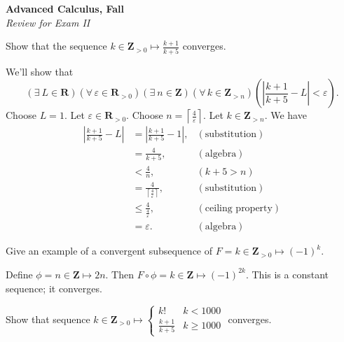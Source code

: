 \documentclass[12pt,fleqn,answers]{exam}
\newcommand{\reals}{\mathbf{R}}
\newcommand{\integers}{\mathbf{Z}}
\let\oldforall\forall
\renewcommand{\forall}{\oldforall \, }
\let\oldexist\exists
\renewcommand{\exists}{\oldexist \: }
\begin{document}
\large
\begin{flushleft}
  \textbf{Advanced Calculus, Fall \the\year}\\
  \emph{Review for Exam II}
\end{flushleft}

\begin{questions}

\question Show that the sequence $k \in \integers_{>0} \mapsto \frac{k+1}{k+5}$ converges.
\begin{solution} We'll show that
\begin{equation*}
  (\exists L \in \reals)
  (\forall \varepsilon \in \reals_{>0})
  (\exists n \in \integers) 
  \left(\forall k \in \integers_{>n}\right )
  \left (\left |  \frac{k+1}{k+5} - L \right | < \varepsilon \right).
\end{equation*}
Choose $L=1$.  Let $\varepsilon \in \reals_{>0}$.  Choose 
$n = \left \lceil \frac{4}{\varepsilon} \right \rceil$.  Let $k \in \integers_{>n}$. We have
\begin{align*}
\left|  \frac{k+1}{k+5} - L \right | &=  \left | \frac{k+1}{k+5} - 1 \right |, & (\mbox{substitution}) \\
                                        &=   \frac{4}{k+5},            &(\mbox{algebra}) \\
                                        &<    \frac{4}{n},                 &(k+5 > n) \\
                                       &=   \frac{4}{\left \lceil \frac{4}{\varepsilon} \right \rceil},  & (\mbox{substitution}) \\ 
                                        &\leq  \frac{4}{ \frac{4}{\varepsilon}},  & (\mbox{ceiling property}) \\ 
                                        &= \varepsilon.  &(\mbox{algebra})
\end{align*}

\end{solution}

\question Give an example of a convergent subsequence of $F = k \in \integers_{>0} \mapsto (-1)^k$.
\begin{solution}
Define $\phi = n \in \integers \mapsto 2 n$.  
Then $F \circ \phi = k \in \integers \mapsto (-1)^{2 k}$.
This is a constant sequence; it converges.

\end{solution}
\question Show that sequence $k \in \integers_{>0} \mapsto \begin{cases}  k!  & k < 1000 \\
\frac{k+1}{k+5} & k \geq 1000 \end{cases} $ converges.


\end{questions}
\end{document}
